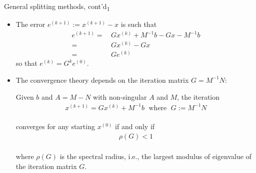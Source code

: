 \documentclass[t,usepdftitle=false]{beamer}
\begin{document}
\begin{frame}{General splitting methods, cont'd\textsubscript{1}}
\begin{itemize}
\item The error $e^{(k+1)}:=x^{(k+1)}-x$ is such that
\begin{align*}
e^{(k+1)}=&\,Gx^{(k)}+M^{-1}b-Gx-M^{-1}b\\
=&\,Gx^{(k)}-Gx\\
=&\,Ge^{(k)}
\end{align*}
so that $e^{(k)}=G^ke^{(0)}$.
\item The convergence theory depends on the iteration matrix $G=M^{-1}N$:
\begin{theorem}
Given $b$ and $A=M-N$ with non-singular $A$ and $M$, the iteration\vspace{-.2cm}
\begin{align*}
x^{(k+1)}=Gx^{(k)}+M^{-1}b
\;\text{ where }\;
G:=M^{-1}N
\end{align*}\vspace{-.7cm}\\
converges for any starting $x^{(0)}$ if and only if\vspace{-.2cm}
\begin{align*}
\rho(G)<1
\end{align*}\vspace{-.7cm}\\
where $\rho(G)$ is the spectral radius, i.e., the largest modulus of eigenvalue of the iteration matrix $G$.
\end{theorem}
\end{itemize}
\end{frame}
\end{document}
